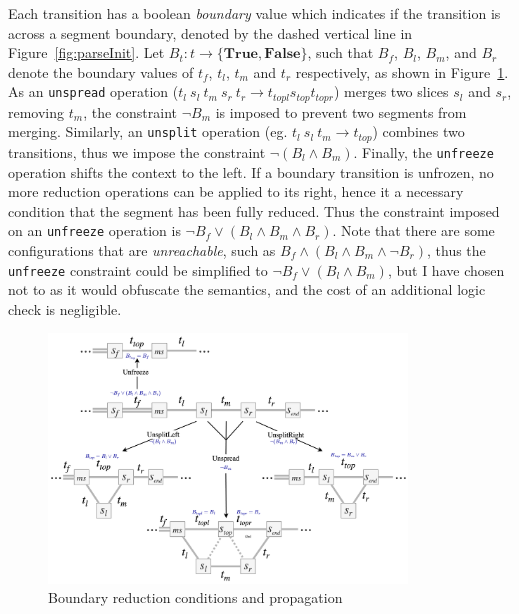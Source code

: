 \documentclass[12pt,a4paper,twoside,openany]{report} \usepackage[pdfborder={0 0 0}]{hyperref}    %
\theoremstyle{definition} \newtheorem{definition}{Definition}[section]
\begin{document}
  Each transition has a boolean \textit{boundary} value which indicates if the transition is across a segment boundary,
  denoted by the dashed vertical line in Figure~\ref{fig:parseInit}. Let $B_t : t \to \{\textbf{True},
  \textbf{False}\}$, such that $B_f$, $B_l$, $B_m$, and $B_r$ denote the boundary values of $t_f$, $t_l$, $t_m$ and
  $t_r$ respectively, as shown in Figure~\ref{fig:parseStateOptions}. As an \texttt{unspread} operation ($t_l~s_l~t_m~s_r~t_r \to t_{topl} s_{top} t_{topr} $) merges
  two slices $s_l$ and $s_r$, removing $t_m$, the constraint $\lnot B_m$ is imposed to prevent two segments from
  merging. Similarly, an \texttt{unsplit} operation (eg. $t_l~s_l~t_m \to t_{top}$) combines two transitions, thus we
  impose the constraint $\lnot (B_l \wedge B_m)$. Finally, the \texttt{unfreeze} operation shifts the context to the
  left. If a boundary transition is unfrozen, no more reduction operations can be applied to its right, hence it
  a necessary condition that the segment has been fully reduced. Thus the constraint imposed on an \texttt{unfreeze}
  operation is $\lnot B_f \vee (B_l \wedge B_m \wedge B_r)$. Note that there are some configurations that are
  \textit{unreachable}, such as $B_f \wedge (B_l \wedge B_m \wedge \lnot B_r)$, thus the \texttt{unfreeze} constraint
  could be simplified to $\lnot B_f \vee (B_l \wedge B_m)$, but I have chosen not to as it would obfuscate the
  semantics, and the cost of an additional logic check is negligible. 

  \begin{figure}[ht] \centering \includegraphics[width=0.85\textwidth]{impl/boundarydiagram/diag.png} \caption{Boundary
  reduction conditions and propagation} \label{fig:parseStateOptions} \end{figure}
\end{document}
